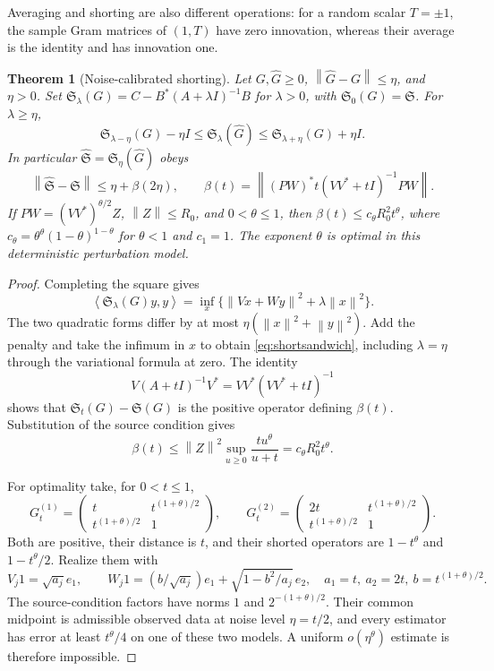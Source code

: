 \documentclass[11pt,a4paper]{amsart}
\numberwithin{equation}{section}
\newtheorem{theorem}{Theorem}[section]
\theoremstyle{definition}
\theoremstyle{remark}
\newcommand{\norm}[1]{\left\lVert#1\right\rVert}
\newcommand{\ip}[2]{\left\langle#1,#2\right\rangle}
\begin{document}
Averaging and shorting are also different operations: for a random scalar $T=\pm1$, the sample Gram matrices of $(1,T)$ have zero innovation, whereas their average is the identity and has innovation one.

\begin{theorem}[Noise-calibrated shorting]\label{thm:noiseshort}
Let $G,\widehat G\ge0$, $\norm{\widehat G-G}\le\eta$, and $\eta>0$. Set
$\mathfrak S_\lambda(G)=C-B^*(A+\lambda I)^{-1}B$ for $\lambda>0$, with $\mathfrak S_0(G)=\mathfrak S$. For $\lambda\ge\eta$,
\begin{equation}\label{eq:shortsandwich}
 \mathfrak S_{\lambda-\eta}(G)-\eta I
 \le\mathfrak S_\lambda(\widehat G)
 \le\mathfrak S_{\lambda+\eta}(G)+\eta I.
\end{equation}
In particular $\widehat{\mathfrak S}=\mathfrak S_\eta(\widehat G)$ obeys
\begin{equation}\label{eq:shorterror}
 \norm{\widehat{\mathfrak S}-\mathfrak S}
 \le\eta+\beta(2\eta),\qquad
 \beta(t)=\norm{(PW)^*t(VV^*+tI)^{-1}PW}.
\end{equation}
If $PW=(VV^*)^{\theta/2}Z$, $\norm Z\le R_0$, and $0<\theta\le1$, then
$\beta(t)\le c_\theta R_0^2t^\theta$, where
$c_\theta=\theta^\theta(1-\theta)^{1-\theta}$ for $\theta<1$ and $c_1=1$.
The exponent $\theta$ is optimal in this deterministic perturbation model.
\end{theorem}
\begin{proof}
Completing the square gives
\[
 \ip{\mathfrak S_\lambda(G)y}y
 =\inf_x\{\norm{Vx+Wy}^2+\lambda\norm x^2\}.
\]
The two quadratic forms differ by at most $\eta(\norm x^2+\norm y^2)$. Add the penalty and take the infimum in $x$ to obtain \eqref{eq:shortsandwich}, including $\lambda=\eta$ through the variational formula at zero. The identity
\[
 V(A+tI)^{-1}V^*=VV^*(VV^*+tI)^{-1}
\]
shows that $\mathfrak S_t(G)-\mathfrak S(G)$ is the positive operator defining $\beta(t)$. Substitution of the source condition gives
\[
 \beta(t)\le\norm Z^2\sup_{u\ge0}\frac{tu^\theta}{u+t}
 =c_\theta R_0^2t^\theta.
\]

For optimality take, for $0<t\le1$,
\[
 G_t^{(1)}=\begin{pmatrix}t&t^{(1+\theta)/2}\\t^{(1+\theta)/2}&1\end{pmatrix},\qquad
 G_t^{(2)}=\begin{pmatrix}2t&t^{(1+\theta)/2}\\t^{(1+\theta)/2}&1\end{pmatrix}.
\]
Both are positive, their distance is $t$, and their shorted operators are $1-t^\theta$ and $1-t^\theta/2$. Realize them with
\[
 V_j1=\sqrt{a_j}e_1,\qquad
 W_j1=(b/\sqrt{a_j})e_1+\sqrt{1-b^2/a_j}\,e_2,
 \quad a_1=t,\ a_2=2t,\ b=t^{(1+\theta)/2}.
\]
The source-condition factors have norms $1$ and $2^{-(1+\theta)/2}$. Their common midpoint is admissible observed data at noise level $\eta=t/2$, and every estimator has error at least $t^\theta/4$ on one of these two models. A uniform $o(\eta^\theta)$ estimate is therefore impossible.
\end{proof}
\end{document}
